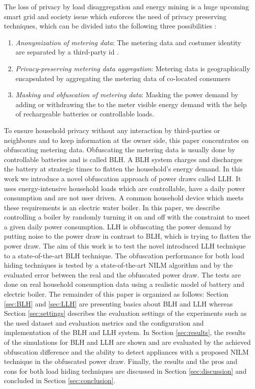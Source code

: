 \documentclass{article}
\begin{document}
The loss of privacy by load disaggregation and energy mining is a huge upcoming smart grid and society issue which enforces the need of privacy preserving techniques, which can be divided into the following three possibilities \cite{Skopik}:
\begin{enumerate}
  \item \textit{Anonymization of metering data}: The metering data and costumer identity are separated by a third-party id \cite{Efthymiou2010}.
  \item \textit{Privacy-preserving metering data aggregation}: Metering data is geographically encapsulated by aggregating the metering data of co-located consumers \cite{Li2011}
   \item \textit{Masking and obfuscation of metering data}: Masking the power demand by adding or withdrawing the to the meter visible energy demand with the help of rechargeable batteries \cite{Yang2012} or controllable loads.
\end{enumerate}
To ensure household privacy without any interaction by third-parties or neighbours and to keep information at the owner side, this paper concentrates on obfuscating metering data. 
Obfuscating the metering data is usually done by controllable batteries and is called \ac{BLH}.
A \ac{BLH} system charges and discharges the battery at strategic times to flatten the household's energy demand.
In this work we introduce a novel obfuscation approach of power draws called \acf{LLH}.
It uses energy-intensive household loads which are controllable, have a daily power consumption and are not user driven.
A common household device which meets these requirements is an electric water boiler. 
In this paper, we describe controlling a boiler by randomly turning it on and off  with the constraint to meet a given daily power consumption.
\ac{LLH} is obfuscating the power demand by putting noise to the power draw in contrast to \ac{BLH}, which is trying to flatten the power draw.\newline
The aim of this work is to test the novel introduced \ac{LLH} technique to a state-of-the-art \ac{BLH} technique.
The obfuscation performance for both load hiding techniques is tested by a state-of-the-art \ac{NILM} algorithm and by the evaluated error between the real and the obfuscated power draw.
The tests are done on real household consumption data using a realistic model of  battery and electric boiler. \newline
The remainder of this paper is organized as follows: Section \ref{sec:BLH} and \ref{sec:LLH} are presenting basics about \ac{BLH} and \ac{LLH} whereas Section \ref{sec:settings} describes the evaluation settings of the experiments such as the used dataset and evaluation metrics and the configuration and implementation of the \ac{BLH} and \ac{LLH} system. 
In Section \ref{sec:results}, the results of the simulations for \ac{BLH} and \ac{LLH} are shown and are evaluated by the achieved obfuscation difference and the ability to detect appliances with a proposed \ac{NILM} technique in the obfuscated power draw.
Finally, the results and the pros and cons for both load hiding techniques are discussed in Section \ref{sec:discussion} and concluded in Section \ref{sec:conclusion}.
 
\end{document}
